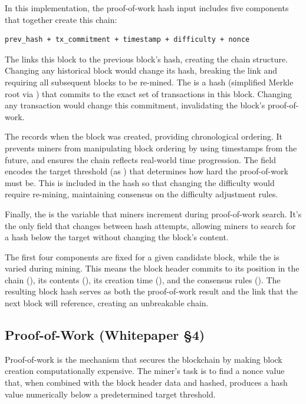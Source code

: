 In this implementation, the proof-of-work hash input includes five components that together create this chain:

\begin{verbatim}
prev_hash + tx_commitment + timestamp + difficulty + nonce
\end{verbatim}

The  links this block to the previous block's hash, creating the chain structure. Changing any historical block would change its hash, breaking the link and requiring all subsequent blocks to be re-mined. The  is a hash (simplified Merkle root via ) that commits to the exact set of transactions in this block. Changing any transaction would change this commitment, invalidating the block's proof-of-work.

The  records when the block was created, providing chronological ordering. It prevents miners from manipulating block ordering by using timestamps from the future, and ensures the chain reflects real-world time progression. The  field encodes the target threshold (as ) that determines how hard the proof-of-work must be. This is included in the hash so that changing the difficulty would require re-mining, maintaining consensus on the difficulty adjustment rules.

Finally, the  is the variable that miners increment during proof-of-work search. It's the only field that changes between hash attempts, allowing miners to search for a hash below the target without changing the block's content.

The first four components are fixed for a given candidate block, while the  is varied during mining. This means the block header commits to its position in the chain (), its contents (), its creation time (), and the consensus rules (). The resulting block hash serves as both the proof-of-work result and the link that the next block will reference, creating an unbreakable chain.

\subsection{Proof-of-Work (Whitepaper \S4)}
\label{sec:ch09-6-pow}

Proof-of-work is the mechanism that secures the blockchain by making block creation computationally expensive. The miner's task is to find a nonce value that, when combined with the block header data and hashed, produces a hash value numerically below a predetermined target threshold.

